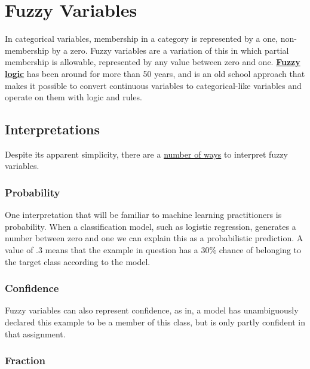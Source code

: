 \section{Fuzzy Variables}
\label{sec:fuzzy}

In categorical variables, membership in a category is represented by a one,
non-membership by a zero. Fuzzy variables are a variation of this
in which partial membership is allowable, represented by any value between
zero and one.
\textbf{\href{https://en.wikipedia.org/wiki/Fuzzy_logic}{Fuzzy logic}}
has been around for more than 50 years,
and is an old school approach that makes it possible to convert
continuous variables to categorical-like variables and operate on them
with logic and rules.

\subsection{Interpretations}
\label{subsec:fuzzyinterpretations}

Despite its apparent simplicity, there are a
\href{https://www.sciencedirect.com/science/article/pii/S0888613X17305108}{number of ways}
to interpret fuzzy variables.

\subsubsection{Probability}
\label{subsubsec:fuzzyprob}

One interpretation that will be familiar to
machine learning practitioners is probability. When a classification model,
such as logistic regression, generates a number between zero and one
we can explain this as a probabilistic prediction. A value of .3 means that
the example in question has a 30\% chance of belonging to the
target class according to the model.

\subsubsection{Confidence}
\label{subsubsec:fuzzyconf}

Fuzzy variables can also represent confidence, as in,
a model has unambiguously declared this example to be a member of this
class, but is only partly confident in that assignment.

\subsubsection{Fraction}
\label{subsubsec:fuzzyfrac}

